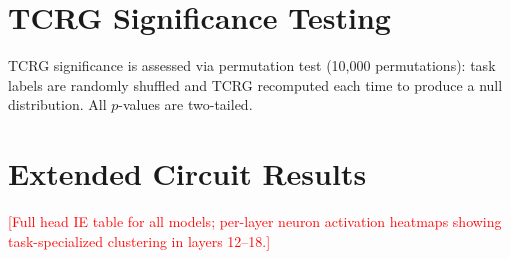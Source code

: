 \documentclass[11pt]{article}
\newcommand{\todo}[1]{\textcolor{red}{[#1]}}
\begin{document}
\section{TCRG Significance Testing}
\label{sec:appendix_stats}

TCRG significance is assessed via permutation test (10,000 permutations): task labels are randomly shuffled and TCRG recomputed each time to produce a null distribution. All $p$-values are two-tailed.

\section{Extended Circuit Results}
\label{sec:appendix_circuits}

\todo{Full head IE table for all models; per-layer neuron activation heatmaps showing task-specialized clustering in layers 12--18.}
\end{document}
